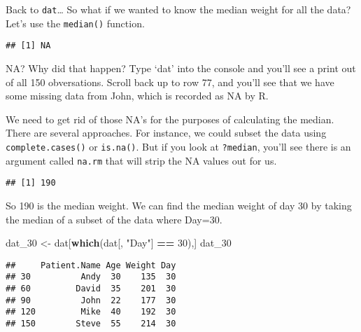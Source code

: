 \documentclass[
]{article}
\newenvironment{Shaded}{\begin{snugshade}}{\end{snugshade}}
\newcommand{\DataTypeTok}[1]{\textcolor[rgb]{0.13,0.29,0.53}{#1}}
\newcommand{\DecValTok}[1]{\textcolor[rgb]{0.00,0.00,0.81}{#1}}
\newcommand{\KeywordTok}[1]{\textcolor[rgb]{0.13,0.29,0.53}{\textbf{#1}}}
\newcommand{\NormalTok}[1]{#1}
\newcommand{\OperatorTok}[1]{\textcolor[rgb]{0.81,0.36,0.00}{\textbf{#1}}}
\newcommand{\OtherTok}[1]{\textcolor[rgb]{0.56,0.35,0.01}{#1}}
\newcommand{\StringTok}[1]{\textcolor[rgb]{0.31,0.60,0.02}{#1}}
\begin{document}
Back to \texttt{dat}\ldots{} So what if we wanted to know the median
weight for all the data? Let's use the \texttt{median()} function.

\begin{Shaded}
\end{Shaded}

\begin{verbatim}
## [1] NA
\end{verbatim}

NA? Why did that happen? Type `dat' into the console and you'll see a
print out of all 150 obversations. Scroll back up to row 77, and you'll
see that we have some missing data from John, which is recorded as NA by
R.

We need to get rid of those NA's for the purposes of calculating the
median. There are several approaches. For instance, we could subset the
data using \texttt{complete.cases()} or \texttt{is.na()}. But if you
look at \texttt{?median}, you'll see there is an argument called
\texttt{na.rm} that will strip the NA values out for us.

\begin{Shaded}
\end{Shaded}

\begin{verbatim}
## [1] 190
\end{verbatim}

So 190 is the median weight. We can find the median weight of day 30 by
taking the median of a subset of the data where Day=30.

\begin{Shaded}
\begin{Highlighting}[]
\NormalTok{dat_}\DecValTok{30}\NormalTok{ <-}\StringTok{ }\NormalTok{dat[}\KeywordTok{which}\NormalTok{(dat[, }\StringTok{"Day"}\NormalTok{] }\OperatorTok{==}\StringTok{ }\DecValTok{30}\NormalTok{),]}
\NormalTok{dat_}\DecValTok{30}
\end{Highlighting}
\end{Shaded}

\begin{verbatim}
##     Patient.Name Age Weight Day
## 30          Andy  30    135  30
## 60         David  35    201  30
## 90          John  22    177  30
## 120         Mike  40    192  30
## 150        Steve  55    214  30
\end{verbatim}
\end{document}
